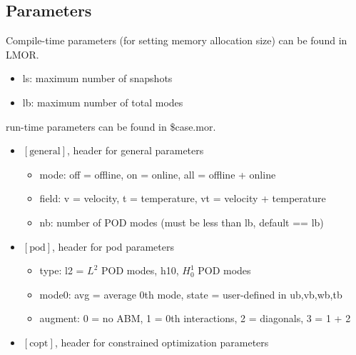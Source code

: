 \subsection{Parameters}

Compile-time parameters (for setting memory allocation size) can be found in LMOR.

\begin{itemize}
\item ls: maximum number of snapshots
\item lb: maximum number of total modes
\end{itemize}

run-time parameters can be found in \$case.mor.
\begin{itemize}
\item $[\text{general}]$, header for general parameters
   \begin{itemize}
   \item mode: off = offline, on = online, all = offline + online
   \item field: v = velocity, t = temperature, vt = velocity + temperature
   \item nb: number of POD modes (must be less than lb, default == lb)
   \end{itemize}
\item $[\text{pod}]$, header for pod parameters
   \begin{itemize}
    \item type: l2 = $L^2$ POD modes, h10, $H^1_0$ POD modes
    \item mode0: avg = average 0th mode, state = user-defined in ub,vb,wb,tb
    \item augment: 0 = no ABM, 1 = 0th interactions, 2 = diagonals, 3 = 1 + 2 \cite{kaneko2022augmented}
   \end{itemize}
\item $[\text{copt}]$, header for constrained optimization parameters \cite{kaneko2020towards}\cite{tsai2022parametric}


\end{itemize}
